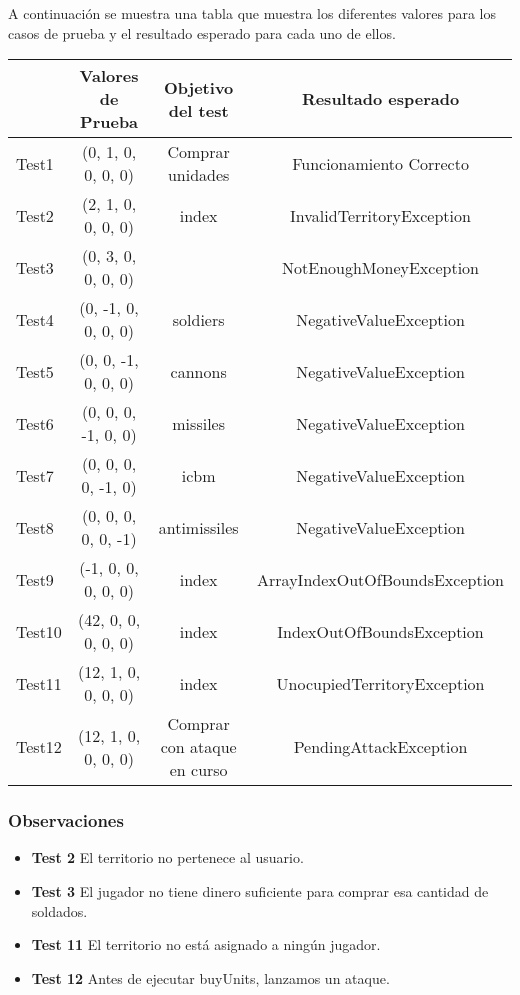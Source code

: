 A continuación se muestra una tabla que muestra los diferentes valores para los casos de prueba y el resultado esperado para cada uno de ellos.

{\footnotesize
\begin{longtable}[c]{lccc}
 & \textbf{Valores de Prueba} & \textbf{Objetivo del test} & \textbf{Resultado esperado}  \\
\hline \hline
\endhead

Test1 & (0, 1, 0, 0, 0, 0) & Comprar unidades & Funcionamiento Correcto\\
Test2 & (2, 1, 0, 0, 0, 0)  & index & InvalidTerritoryException\\
Test3 & (0, 3, 0, 0, 0, 0)  &  & NotEnoughMoneyException \\
Test4 & (0, -1, 0, 0, 0, 0)  & soldiers & NegativeValueException \\
Test5 & (0, 0, -1, 0, 0, 0)  & cannons & NegativeValueException \\
Test6 & (0, 0, 0, -1, 0, 0)  & missiles  & NegativeValueException \\
Test7 & (0, 0, 0, 0, -1, 0)  & icbm & NegativeValueException \\
Test8 & (0, 0, 0, 0, 0, -1)  & antimissiles & NegativeValueException \\
Test9 & (-1, 0, 0, 0, 0, 0) & index & ArrayIndexOutOfBoundsException \\
Test10 & (42, 0, 0, 0, 0, 0) & index & IndexOutOfBoundsException\\
Test11 & (12, 1, 0, 0, 0, 0)  & index & UnocupiedTerritoryException\\
Test12 & (12, 1, 0, 0, 0, 0)  & Comprar con ataque en curso & PendingAttackException\\

\hline
\end{longtable}
\subsubsection{Observaciones}
\begin{itemize}
 \item \textbf{Test 2} El territorio no pertenece al usuario.
\item \textbf{Test 3} El jugador no tiene dinero suficiente para comprar esa cantidad de soldados.
\item \textbf{Test 11} El territorio no está asignado a ningún jugador.
\item \textbf{Test 12} Antes de ejecutar buyUnits, lanzamos un ataque.
\end{itemize}

}
